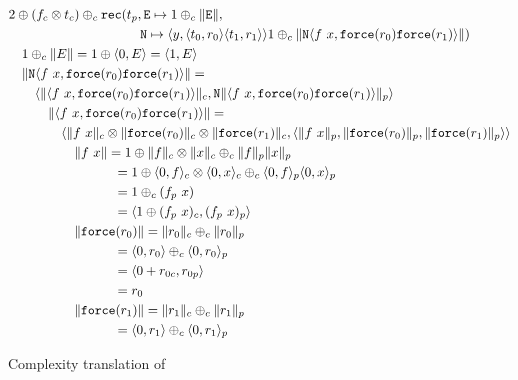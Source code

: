 \begin{figure}
  \label{fig:ws_treemap_complexity_translation}
  \caption{Complexity translation of }
  \begin{equation*}
    \begin{split}
      &2 \oplus (f_c \otimes t_c) \oplus_c \T{rec}(t_p, \T{E} \mapsto 1 \oplus_c \|\T{E}\|, \\
      &\quadten \T{N} \mapsto \langle y, \langle t_0, r_0 \rangle \langle t_1, r_1 \rangle \rangle 1 \oplus_c \|\T{N}\langle f\ x, \T{force}(r_0) \T{force}(r_1)\rangle \| ) \\
      &\quad 1 \oplus_c \|E\| = 1 \oplus \langle 0, E \rangle = \langle 1, E \rangle \\
      &\quad \|\T{N}\langle f\ x, \T{force}(r_0) \T{force}(r_1)\rangle \| = \\
      &\qquad \langle \|\langle f\ x, \T{force}(r_0) \T{force}(r_1)\rangle \|_c, \T{N} \|\langle f\ x, \T{force}(r_0) \T{force}(r_1)\rangle\|_p\rangle \\
      &\quadthree \|\langle f\ x, \T{force}(r_0) \T{force}(r_1)\rangle \| = \\
      &\quadfour \langle \|f\ x\|_c \otimes \|\T{force}(r_0)\|_c \otimes \|\T{force}(r_1)\|_c, \langle \|f\ x\|_p, \|\T{force}(r_0)\|_p, \|\T{force}(r_1)\|_p \rangle \rangle \\
      &\quadfive  \|f\ x\| = 1 \oplus \|f\|_c \otimes \|x\|_c \oplus_c \|f\|_p \|x\|_p \\
      &\quadeight = 1 \oplus \langle 0, f \rangle_c \otimes \langle 0, x \rangle_c \oplus_c \langle 0, f \rangle_p \langle 0, x \rangle_p \\
      &\quadeight = 1 \oplus_c (f_p\ x) \\
      &\quadeight = \langle 1 \oplus (f_p\ x)_c, (f_p\ x)_p \rangle \\
      &\quadfive \|\T{force}(r_0)\| = \|r_0\|_c \oplus_c \|r_0\|_p \\
      &\quadeight = \langle 0, r_0 \rangle \oplus_c \langle 0, r_0 \rangle_p \\
      &\quadeight = \langle 0 + r_{0c}, r_{0p} \rangle \\
      &\quadeight = r_0 \\
      &\quadfive \|\T{force}(r_1)\| = \|r_1\|_c \oplus_c \|r_1\|_p \\
      &\quadeight = \langle 0, r_1 \rangle \oplus_c \langle 0, r_1 \rangle_p \\

\end{split}
\end{equation*}
\end{figure}
